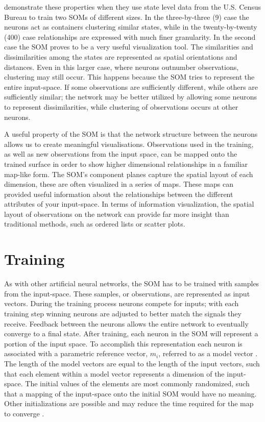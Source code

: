 \cite{skupin08} demonstrate these properties when they use state level data
from the U.S. Census Bureau to train two SOMs of different sizes.  In the
three-by-three (9) case the neurons act as containers clustering similar
states, while in the twenty-by-twenty (400) case relationships are expressed
with much finer granularity.  In the second case the SOM proves to be a very
useful visualization tool.  The similarities and dissimilarities among the
states are represented as spatial orientations and distances.  Even in this
larger case, where neurons outnumber observations, clustering may still occur.
This happens because the SOM tries to represent the entire input-space.  If
some observations are sufficiently different, while others are sufficiently
similar; the network may be better utilized by allowing some neurons to
represent dissimilarities, while clustering of observations occurs at other
neurons.

A useful property of the SOM is that the network structure between the neurons
allows us to create meaningful visualisations.  Observations used in the
training, as well as new observations from the input space, can be mapped
onto the trained surface in order to show higher dimensional relationships in a
familiar map-like form. The SOM's component planes capture the spatial layout
of each dimension, these are often visualized in a series of maps.  These
maps can provided useful information about the relationships between the
different attributes of your input-space.  In terms of information
visualization, the spatial layout of observations on the network can provide far
more insight than traditional methods, such as ordered lists or scatter
plots.

\section{Training}
\label{bg:train}
As with other artificial neural networks, the SOM has to be trained with
samples from the input-space.  These samples, or observations, are represented
as input vectors.  During the training process neurons compete for inputs;
with each training step winning neurons are adjusted to better match the
signals they receive.  Feedback between the neurons allows the entire network to
eventually converge to a final state. After training, each neuron in the SOM
will represent a portion of the input space.  To accomplish this
representation each neuron is associated with a parametric reference vector,
\(m_i\), referred to as a model vector \citep{Kohonen2000}.  The length of the
model vectors are equal to the length of the input vectors, such that each
element within a model vector represents a dimension of the input-space.  The
initial values of the elements are most commonly randomized, such that a
mapping of the input-space onto the initial SOM would have no meaning. Other
initializations are possible and may reduce the time required for the map to
converge \citep{Kohonen2000}.

